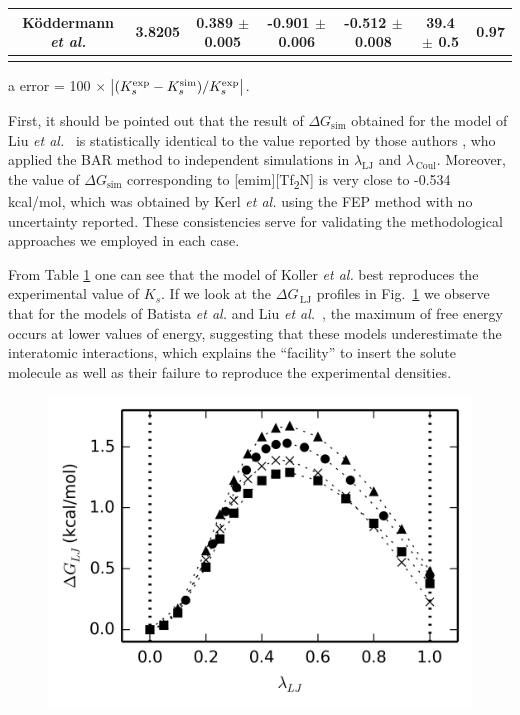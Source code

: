 \documentclass[3p,twocolumn]{elsarticle}
\begin{document}
\begin{table}
\begin{adjustbox}{width=1\textwidth}
\begin{threeparttable}
\begin{tabular}{ c c c  c  c  c  c }
		\hline
 K\"{o}ddermann \textit{et al.} \cite{K_ddermann_2007} &3.8205 & 0.389 $\pm$ 0.005 & -0.901 $\pm$ 0.006& -0.512 $\pm$ 0.008 & 39.4 $\pm$ 0.5  & 0.97  \\
 \bottomrule
\label{table:henry} 
\end{tabular}
\begin{tablenotes}
\item[a] error = 100 $\times$ $\abs{(K_s^{\text{exp}} - K_s^{\text{sim}})/K_s^{\text{exp}}}$.
\end{tablenotes}
\end{threeparttable}
\end{adjustbox}
\end{table}

First, it should be pointed out that the result of $\Delta G_{\text{sim}}$ obtained for the model of Liu \textit{et al.}~\cite{Liu_2014} is statistically identical to the value reported by those authors \cite{Liu_2014_1}, who applied the BAR method \cite{Bennett_1976} to independent simulations in $\lambda_{\text{LJ}}$ and $\lambda_{\, \text{Coul}}$. Moreover, the value of $\Delta G_{\text{sim}}$ corresponding to [emim][Tf\textsubscript{2}N] is very close to -0.534 kcal/mol, which was obtained by Kerl \textit{et al.} \cite{Kerl__2017} using the FEP method \cite{Zwanzig_1954} with no uncertainty reported. These consistencies serve for validating the methodological approaches we employed in each case.

From Table \ref{table:henry} one can see that the model of Koller \textit{et al.} \cite{Koller_2012} best reproduces the experimental value of $K_s$. If we look at the $\Delta G_{\, \text{LJ}}$ profiles in Fig.~\ref{fig:deltag} we observe that for the models of Batista \textit{et al.} \cite{Batista_2015} and Liu \textit{et al.}~\cite{Liu_2014}, the maximum of free energy occurs at lower values of energy, suggesting that these models underestimate the interatomic interactions, which explains the ``facility'' to insert the solute molecule as well as their failure to reproduce the experimental densities.

\begin{figure}[]
\includegraphics[width=\linewidth]{free_energy_paper}
\label{fig:deltag}
\end{figure}
\end{document}

